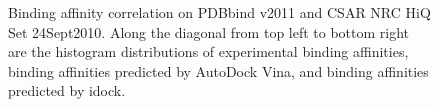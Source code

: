 \documentclass[12pt]{article}
\begin{document}
\begin{center}
\begin{figure}
\caption{\label{FECorrelation} Binding affinity correlation on PDBbind v2011 and CSAR NRC HiQ Set 24Sept2010. Along the diagonal from top left to bottom right are the histogram distributions of experimental binding affinities, binding affinities predicted by AutoDock Vina, and binding affinities predicted by idock.}
\end{figure}
\end{center}

\clearpage
\end{document}
